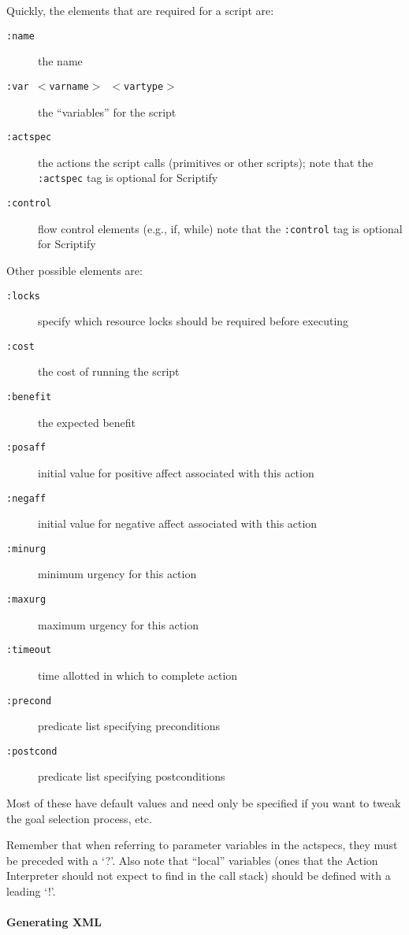 \documentclass[11pt,letterpaper]{article}
\begin{document}
Quickly, the elements that are required for a script are:

\begin{description}
\item[\tt :name] the name
\item[\tt :var $<$varname$>$ $<$vartype$>$] the ``variables'' for the script
\item[\tt :actspec] the actions the script calls (primitives or other scripts);
  note that the {\tt :actspec} tag is optional for Scriptify
\item[\tt :control] flow control elements (e.g., if, while)
  note that the {\tt :control} tag is optional for Scriptify
\end{description}

\noindent Other possible elements are:

\begin{description}
\item[\tt :locks] specify which resource locks should be required before executing
\item[\tt :cost] the cost of running the script
\item[\tt :benefit] the expected benefit
\item[\tt :posaff] initial value for positive affect associated with this action
\item[\tt :negaff] initial value for negative affect associated with this action
\item[\tt :minurg] minimum urgency for this action
\item[\tt :maxurg] maximum urgency for this action
\item[\tt :timeout] time allotted in which to complete action
\item[\tt :precond] predicate list specifying preconditions
\item[\tt :postcond] predicate list specifying postconditions
\end{description}

\noindent Most of these have default values and need only be specified
if you want to tweak the goal selection process, etc.

Remember that when referring to parameter variables in the 
actspecs, they must be preceded with a `?'.  Also note that ``local''
variables (ones that the Action Interpreter should not expect to find in
the call stack) should be defined with a leading `!'.

\paragraph{Generating XML}
\end{document}
